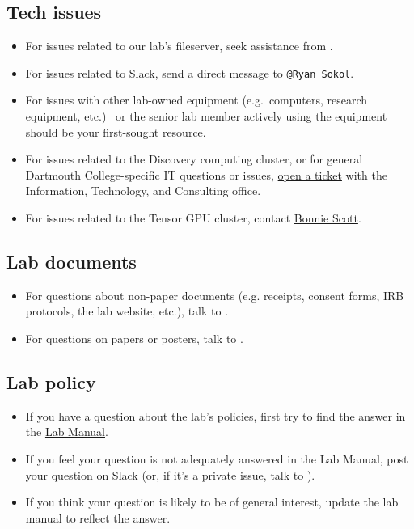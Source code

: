 \documentclass{tufte-book} %
\newcommand{\ourschool}{Dartmouth College}
\begin{document}
\subsection{Tech issues}
\begin{itemize}
\item For issues related to our lab's fileserver, seek assistance from
  \director.

\item For issues related to Slack, send a direct message to \texttt{@Ryan Sokol}.

\item For issues with other lab-owned equipment (e.g.~computers,
  research equipment, etc.) \coordinator~or the senior lab member
  actively using the equipment should be your first-sought resource.

\item For issues related to the Discovery computing cluster, or for general \ourschool-specific IT questions or issues,
  \href{mailto:help@dartmouth.edu}{open a ticket} with the Information,
  Technology, and Consulting office.

\item For issues related to the Tensor GPU cluster, contact \href{mailto:Bonnie.J.Scott@dartmouth.edu}{Bonnie Scott}.
\end{itemize}

\subsection{Lab documents}
\begin{itemize}
\item For questions about non-paper documents (e.g. receipts, consent
  forms, IRB protocols, the lab website, etc.), talk to \coordinator.

\item For questions on papers or posters, talk to \director.
\end{itemize}

\subsection{Lab policy}
\begin{itemize}
\item If you have a question about the lab's policies, first try to
  find the answer in the
  \href{https://github.com/ContextLab/lab-manual/tree/master/lab_manual.pdf}{Lab
    Manual}.

\item If you feel your question is not adequately answered in the Lab
  Manual, post your question on Slack (or, if it's a private issue,
  talk to \director).

\item If you think your question is likely to be of general interest,
  update the lab manual to reflect the answer.
\end{itemize}
\end{document}
